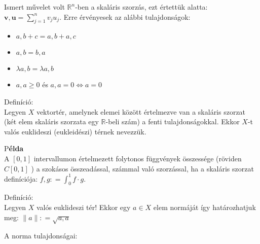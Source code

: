 \documentclass[]{scrartcl}
\providecommand{\tightlist}{%
  \setlength{\itemsep}{0pt}\setlength{\parskip}{0pt}}
\newenvironment{definicio}{}{}
\newenvironment{pelda}{}{}
\begin{document}
Ismert művelet volt \({\mathbb{R}}^{n}\)-ben a skaláris szorzás, ezt
értettük alatta:
\({\mathbf{v},\mathbf{u}} = {\sum\limits_{j = 1}^{n}{v_{j}u_{j}}}\).
Erre érvényesek az alábbi tulajdonságok:

\begin{itemize}
\tightlist
\item
  \({a,b + c} = {a,b} + {a,c}\)
\item
  \({a,b} = {b,a}\)
\item
  \(\lambda{a,b} = {\lambda a,b}\)
\item
  \({a,a} \geq 0\) és \(\left. {a,a} = 0\Leftrightarrow a = 0 \right.\)
\end{itemize}

\begin{definicio}

Definíció:\\
Legyen \(X\) vektortér, amelynek elemei között értelmezve van a skaláris
szorzat (két elem skaláris szorzata egy \(\mathbb{R}\)-beli szám) a
fenti tulajdonságokkal. Ekkor \(X\)-t valós euklideszi (eukleidészi)
térnek nevezzük.

\end{definicio}

\begin{pelda}

P\textbf{élda}\\
A \(\left\lbrack 0,1 \right\rbrack\) intervallumon értelmezett folytonos
függvények összessége (röviden \(C\left\lbrack 0,1 \right\rbrack\) ) a
szokásos összeadással, számmal való szorzással, ha a skaláris szorzat
definíciója: \({f,g}: = {\int_{0}^{1}{f \cdot g}}\).

\end{pelda}

\begin{definicio}

Definíció:\\
Legyen \(X\) valós euklideszi tér! Ekkor egy \(a \in X\) elem normáját
így határozhatjuk meg: \(\left\| a \parallel \right.: = \sqrt{a,a}\)

\end{definicio}

A norma tulajdonságai:
\end{document}
